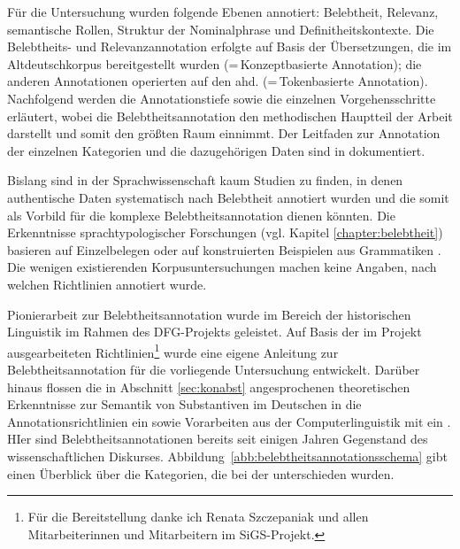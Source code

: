 Für die Untersuchung wurden folgende Ebenen  annotiert: Belebtheit, Relevanz, semantische Rollen, Struktur der Nominalphrase  und  Definitheitskontexte. Die Belebtheits- und Relevanzannotation  erfolgte auf Basis der Übersetzungen, die im Altdeutschkorpus  bereitgestellt wurden (=\,Konzeptbasierte Annotation); die anderen Annotationen  operierten auf den ahd.   (=\,Tokenbasierte Annotation). Nachfolgend werden die Annotationstiefe  sowie die einzelnen Vorgehensschritte erläutert, wobei die Belebtheitsannotation  den methodischen Hauptteil der Arbeit darstellt und somit den größten Raum einnimmt. Der Leitfaden zur Annotation  der einzelnen Kategorien und die dazugehörigen Daten sind in \textcite{HZKYL4_2020} dokumentiert. 


Bislang sind in der Sprachwissenschaft kaum Studien zu finden, in denen authentische Daten systematisch nach Belebtheit annotiert  wurden und die somit als Vorbild für die komplexe  Belebtheitsannotation  dienen könnten. Die Erkenntnisse sprachtypologischer Forschungen (vgl. Kapitel \ref{chapter:belebtheit}) basieren auf Einzelbelegen oder auf konstruierten Beispielen aus Grammatiken \parencite[z.B.][]{Comrie1989,Corbett2000,Aissen2003}. Die wenigen existierenden Korpusuntersuchungen  \parencite{Dahl1996,Yamamoto1999} machen keine Angaben, nach welchen Richtlinien annotiert  wurde.

Pionierarbeit zur Belebtheitsannotation  wurde im Bereich der historischen Linguistik im Rahmen des DFG-Projekts  \parencite[vgl.][]{Szczepaniak2016} geleistet. Auf Basis der im Projekt ausgearbeiteten Richtlinien\footnote{Für die Bereitstellung danke ich Renata Szczepaniak und allen Mitarbeiterinnen und Mitarbeitern im SiGS-Projekt.} wurde eine eigene Anleitung zur Belebtheitsannotation  für die vorliegende Untersuchung entwickelt. Darüber hinaus flossen die in Abschnitt \ref{sec:konabst} angesprochenen theoretischen Erkenntnisse zur Semantik von Substantiven im Deutschen \parencite[u.a.][]{Ewald1992,Studler2011} in die Annotationsrichtlinien  ein sowie  Vorarbeiten aus der Computerlinguistik mit ein \parencite[vgl.][]{Garretson2004,Zaenen2004,Ovrelid2009}. HIer sind Belebtheitsannotationen  bereits seit einigen Jahren Gegenstand des wissenschaftlichen Diskurses. Abbildung~\ref{abb:belebtheitsannotationsschema} gibt einen Überblick über die Kategorien, die bei der  unterschieden wurden.

